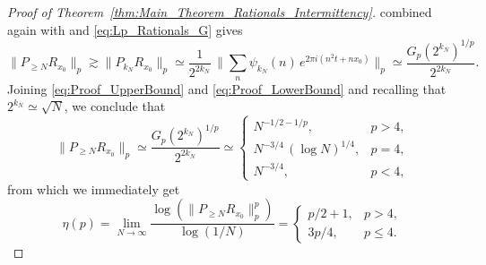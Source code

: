 \documentclass[11pt,reqno]{amsart}
\theoremstyle{definition}
\begin{document}
\begin{proof}[Proof of Theorem~\ref{thm:Main_Theorem_Rationals_Intermittency}]
combined again with 
\cite[Lemma 3.1, Corollary 3.2]{EceizabarrenaVilacaDaRocha2022}
and \eqref{eq:Lp_Rationals_G} gives
\begin{equation}\label{eq:Proof_LowerBound}
\lVert P_{\geq N} R_{x_0} \rVert_p 
\gtrsim \lVert P_{k_N}R_{x_0} \rVert_p
\simeq \frac{1}{2^{2k_N}}  \,   \Big\lVert \sum_{n} \psi_{k_N}(n) \, e^{2\pi i (n^2 t + nx_0)} \Big\rVert_p
\simeq \frac{G_p(2^{k_N})^{1/p}}{2^{2k_N}}. 
\end{equation}
Joining \eqref{eq:Proof_UpperBound} and \eqref{eq:Proof_LowerBound}
and recalling that $2^{k_N} \simeq \sqrt{N}$, 
we conclude that
\begin{equation}
\lVert P_{\geq N} R_{x_0} \rVert_p  
\simeq \frac{G_p(2^{k_N})^{1/p}}{2^{2k_N}}
\simeq \left\{
\begin{array}{ll}
N^{-1/2 - 1/p}, & p > 4, \\
N^{-3/4} \, (\log N)^{1/4}, & p = 4, \\
N^{-3/4}, & p < 4,
\end{array}\right.
\end{equation}
from which we immediately get
\begin{equation}
\eta(p) 
= \lim_{N \to \infty} \frac{\log (\lVert  P_{\geq N} R_{x_0} \rVert_p^p ) }{\log (1/N)}
= \left\{
\begin{array}{ll}
p/2 + 1, & p > 4, \\
3p/4, & p \leq 4.
\end{array}
\right.
\end{equation}
\end{proof}
\end{document}
